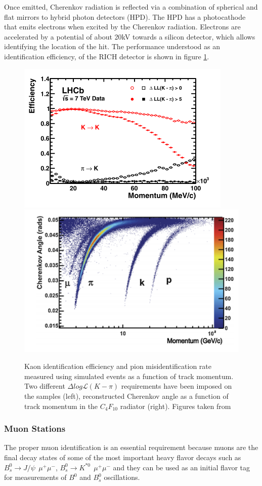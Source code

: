 Once emitted, Cherenkov radiation is reflected via a combination of spherical and flat mirrors to hybrid photon detectors (HPD). The HPD has a photocathode that emits electrons when excited by the Cherenkov radiation. Electrons are accelerated by a potential of about 20kV towards a silicon detector, which allows identifying the location of the hit. The performance understood as an identification efficiency, of the RICH detector is shown in figure \ref{fig:RICH_performance}. 


\begin{figure}[h]
 \begin{center}
  \includegraphics[width=0.49\linewidth]{figures/Kaon_proton.PNG}
   \includegraphics[width=0.49\linewidth]{figures/Chernkov_angle.PNG}
    \caption{Kaon identification efficiency and pion misidentification rate measured using simulated events as a function of track momentum. Two different $\Delta log \mathcal{L}(K − \pi)$ requirements have been imposed on the
samples (left), reconstructed Cherenkov angle as a function of track momentum in the $C_4F_{10}$ radiator (right). Figures taken from \cite{RICH_performance}}%
    \label{fig:RICH_performance}%
 \end{center}
\end{figure}


\subsubsection{Muon Stations}

The proper muon identification is an essential requirement because muons are the final decay states of some of the most important heavy flavor decays such as $B_s^0 \rightarrow J/\psi ~~ \mu^{+}\mu^{-}$,  $B^{0}_s \rightarrow K^{*0} ~~ \mu^{+}\mu^{-}$ and they can be used as an initial flavor tag for measurements of $B^0$  and $B^0_{s}$ oscillations. 

